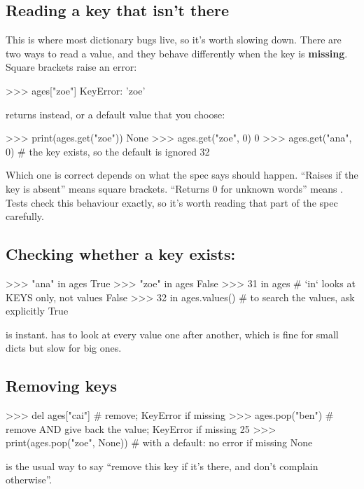 \documentclass[10pt,a4paper]{article}
\begin{document}
\subsection{Reading a key that isn’t there}
This is where most dictionary bugs live, so it’s worth slowing down. There are two ways to read a value, and they behave differently when the key is \textbf{missing}.
Square brackets raise an error:
\begin{txtcode}
>>> ages["zoe"]
KeyError: 'zoe'
\end{txtcode}
 returns  instead, or a default value that you choose:
\begin{txtcode}
>>> print(ages.get("zoe"))
None
>>> ages.get("zoe", 0)
0
>>> ages.get("ana", 0)       # the key exists, so the default is ignored
32
\end{txtcode}
Which one is correct depends on what the spec says should happen. “Raises  if the key is absent” means square brackets. “Returns 0 for unknown words” means . Tests check this behaviour exactly, so it’s worth reading that part of the spec carefully.
\subsection{Checking whether a key exists: }
\begin{txtcode}
>>> "ana" in ages
True
>>> "zoe" in ages
False
>>> 31 in ages               # `in` looks at KEYS only, not values
False
>>> 32 in ages.values()      # to search the values, ask explicitly
True
\end{txtcode}
 is instant.  has to look at every value one after another, which is fine for small dicts but slow for big ones.
\subsection{Removing keys}
\begin{txtcode}
>>> del ages["cai"]          # remove; KeyError if missing
>>> ages.pop("ben")          # remove AND give back the value; KeyError if missing
25
>>> print(ages.pop("zoe", None))   # with a default: no error if missing
None
\end{txtcode}
 is the usual way to say “remove this key if it’s there, and don’t complain otherwise”.
\end{document}
